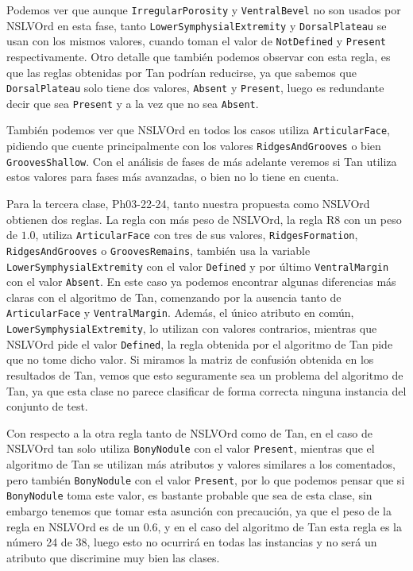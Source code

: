 Podemos ver que aunque \texttt{IrregularPorosity} y \texttt{VentralBevel} no son usados por NSLVOrd en esta fase, tanto \texttt{LowerSymphysialExtremity} y \texttt{DorsalPlateau} se usan con los mismos valores, cuando toman el valor de \texttt{NotDefined} y \texttt{Present} respectivamente. Otro detalle que también podemos observar con esta regla, es que las reglas obtenidas por Tan podrían reducirse, ya que sabemos que \texttt{DorsalPlateau} solo tiene dos valores, \texttt{Absent} y \texttt{Present}, luego es redundante decir que sea \texttt{Present} y a la vez que no sea \texttt{Absent}.

También podemos ver que NSLVOrd en todos los casos utiliza \texttt{ArticularFace}, pidiendo que cuente principalmente con los valores \texttt{RidgesAndGrooves} o bien \texttt{GroovesShallow}. Con el análisis de fases de más adelante veremos si Tan utiliza estos valores para fases más avanzadas, o bien no lo tiene en cuenta.

Para la tercera clase, Ph03-22-24, tanto nuestra propuesta como NSLVOrd obtienen dos reglas. La regla con más peso de NSLVOrd, la regla R8 con un peso de $1.0$, utiliza \texttt{ArticularFace} con tres de sus valores, \texttt{RidgesFormation}, \texttt{RidgesAndGrooves} o \texttt{GroovesRemains}, también usa la variable \texttt{LowerSymphysialExtremity} con el valor \texttt{Defined} y por último \texttt{VentralMargin} con el valor \texttt{Absent}. En este caso ya podemos encontrar algunas diferencias más claras con el algoritmo de Tan, comenzando por la ausencia tanto de \texttt{ArticularFace} y \texttt{VentralMargin}. Además, el único atributo en común, \texttt{LowerSymphysialExtremity}, lo utilizan con valores contrarios, mientras que NSLVOrd pide el valor \texttt{Defined}, la regla obtenida por el algoritmo de Tan pide que no tome dicho valor. Si miramos la matriz de confusión obtenida en los resultados de Tan, vemos que esto seguramente sea un problema del algoritmo de Tan, ya que esta clase no parece clasificar de forma correcta ninguna instancia del conjunto de test.

Con respecto a la otra regla tanto de NSLVOrd como de Tan, en el caso de NSLVOrd tan solo utiliza \texttt{BonyNodule} con el valor \texttt{Present}, mientras que el algoritmo de Tan se utilizan más atributos y valores similares a los comentados, pero también \texttt{BonyNodule} con el valor \texttt{Present}, por lo que podemos pensar que si \texttt{BonyNodule} toma este valor, es bastante probable que sea de esta clase, sin embargo tenemos que tomar esta asunción con precaución, ya que el peso de la regla en NSLVOrd es de un $0.6$, y en el caso del algoritmo de Tan esta regla es la número 24 de 38, luego esto no ocurrirá en todas las instancias y no será un atributo que discrimine muy bien las clases.


